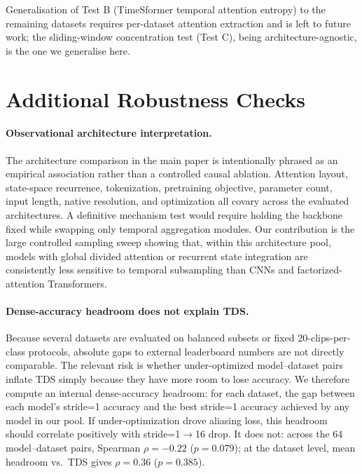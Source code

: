 \documentclass[runningheads]{llncs}
\newcommand{\TDS}{\textsc{TDS}}
\begin{document}
Generalisation of Test B (TimeSformer temporal attention entropy) to the remaining datasets requires per-dataset attention extraction and is left to future work; the sliding-window concentration test (Test C), being architecture-agnostic, is the one we generalise here.

\section{Additional Robustness Checks}
\label{sec:sup_extra_checks}

\paragraph{Observational architecture interpretation.}
The architecture comparison in the main paper is intentionally phrased as an empirical association rather than a controlled causal ablation. Attention layout, state-space recurrence, tokenization, pretraining objective, parameter count, input length, native resolution, and optimization all covary across the evaluated architectures. A definitive mechanism test would require holding the backbone fixed while swapping only temporal aggregation modules. Our contribution is the large controlled sampling sweep showing that, within this architecture pool, models with global divided attention or recurrent state integration are consistently less sensitive to temporal subsampling than CNNs and factorized-attention Transformers.

\paragraph{Dense-accuracy headroom does not explain \TDS{}.}
Because several datasets are evaluated on balanced subsets or fixed 20-clips-per-class protocols, absolute gaps to external leaderboard numbers are not directly comparable. The relevant risk is whether under-optimized model--dataset pairs inflate \TDS{} simply because they have more room to lose accuracy. We therefore compute an internal dense-accuracy headroom: for each dataset, the gap between each model's stride=1 accuracy and the best stride=1 accuracy achieved by any model in our pool. If under-optimization drove aliasing loss, this headroom should correlate positively with stride=1$\to$16 drop. It does not: across the 64 model--dataset pairs, Spearman $\rho=-0.22$ ($p=0.079$); at the dataset level, mean headroom vs.\ \TDS{} gives $\rho=0.36$ ($p=0.385$).
\end{document}
